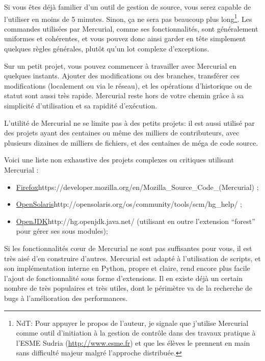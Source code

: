 Si vous êtes déjà familier d'un outil de gestion de source, vous serez
capable de l'utiliser en moins de 5 minutes. Sinon, ça ne sera pas beaucoup
plus long\footnote{NdT: Pour appuyer le propos de l'auteur, je signale que 
j'utilise Mercurial comme outil d'initiation à la gestion de contrôle dans
des travaux pratique à l'ESME Sudria (\url{http://www.esme.fr}) et que les
élèves le prennent en main sans difficulté majeur malgré l'approche distribuée.}. 
Les commandes utilisées par Mercurial, comme ses fonctionnalités, sont 
généralement uniformes et cohérentes, et vous pouvez donc ainsi garder en tête 
simplement quelques règles générales, plutôt qu'un lot complexe d'exceptions.

Sur un petit projet, vous pouvez commencer à travailler avec Mercurial en
quelques instants. Ajouter des modifications ou des branches, transférer 
ces modifications (localement ou via le réseau), et les opérations 
d'historique ou de statut sont aussi très rapide. Mercurial reste hors de 
votre chemin grâce à sa simplicité d'utilisation et sa rapidité d'exécution.

L'utilité de Mercurial ne se limite pas à des petits projets: il est 
aussi utilisé par des projets ayant des centaines ou même des milliers
de contributeurs, avec plusieurs dizaines de milliers de fichiers, et des
centaines de méga de code source.

Voici une liste non exhaustive des projets complexes ou critiques utilisant 
Mercurial :
\begin{itemize}
	\item \url{Firefox}{https://developer.mozilla.org/en/Mozilla_Source_Code_(Mercurial)} ;
	\item \url{OpenSolaris}{http://opensolaris.org/os/community/tools/scm/hg_help/} ;
	\item \url{OpenJDK}{http://hg.openjdk.java.net/} (utilisant en outre l'extension 
	``forest'' pour gérer ses sous modules);
\end{itemize}

Si les fonctionnalités cœur de Mercurial ne sont pas suffisantes pour vous, 
il est très aisé d'en construire d'autres. Mercurial est adapté à l'utilisation
de scripts, et son implémentation interne en Python, propre et claire,
rend encore plus facile l'ajout de fonctionnalité sous forme d'extensions. Il
en existe déjà un certain nombre de très populaires et très utiles, 
dont le périmètre va de la recherche de bugs à l'amélioration des performances.


